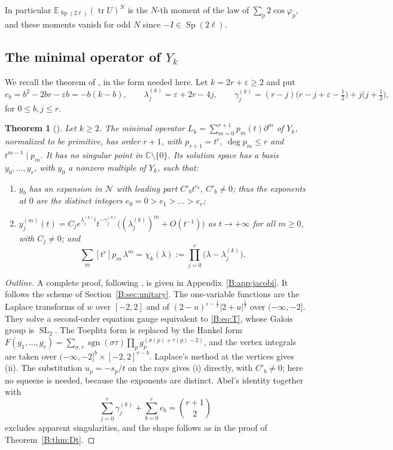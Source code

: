 \documentclass[11pt,a4paper]{article}
\newtheorem{theorem}{Theorem}[section]
\theoremstyle{definition}
\theoremstyle{remark}
\newcommand{\C}{\mathbb C}
\newcommand{\E}{\mathbb E}
\DeclareMathOperator{\sgn}{sgn}
\DeclareMathOperator{\SL}{SL}
\DeclareMathOperator{\tr}{tr}
\DeclareMathOperator{\Sp}{Sp}
\numberwithin{equation}{section}
\begin{document}
In particular $\E_{\Sp(2\ell)}(\tr U)^{N}$ is the $N$-th moment of the law of $\sum_p2\cos\varphi_p$, and these moments vanish for odd $N$ since $-I\in\Sp(2\ell)$.

\subsection{The minimal operator of \texorpdfstring{$Y_k$}{Yk}}
We recall the theorem of \cite{Kei26}, in the form needed here. Let $k=2r+\varepsilon\ge2$ and put
\begin{equation}\label{B:eq:jacobi-data}
e_b=b^2-2br-\varepsilon b=-b(k-b),\qquad \lambda^{(k)}_j=\varepsilon+2r-4j,\qquad \gamma^{(k)}_j=(r-j)\bigl(r-j+\varepsilon-\tfrac12\bigr)+j\bigl(j+\tfrac12\bigr),
\end{equation}
for $0\le b,j\le r$.

\begin{theorem}[\cite{Kei26}]\label{B:thm:jacobi}
Let $k\ge2$. The minimal operator $L_k=\sum_{m=0}^{r+1}p_m(t)\partial^m$ of $Y_k$, normalized to be primitive, has order $r+1$, with $p_{r+1}=t^r$, $\deg p_m\le r$ and $t^{m-1}\mid p_m$. It has no singular point in $\C\setminus\{0\}$. Its solution space has a basis $y_0,\dots,y_r$, with $y_0$ a nonzero multiple of $Y_k$, such that:
\begin{enumerate}
\item[(i)] $y_b$ has an expansion in $\mathcal N$ with leading part $C'_bt^{e_b}$, $C'_b\ne0$; thus the exponents at $0$ are the distinct integers $e_0=0>e_1>\dots>e_r$;
\item[(ii)] $y_j^{(m)}(t)=C_je^{\lambda^{(k)}_jt}t^{-\gamma^{(k)}_j}\bigl((\lambda^{(k)}_j)^m+O(t^{-1})\bigr)$ as $t\to+\infty$ for all $m\ge0$, with $C_j\ne0$; and
\[
\sum_m[t^r]p_m\,\lambda^m=\chi_k(\lambda):=\prod_{j=0}^{r}\bigl(\lambda-\lambda^{(k)}_j\bigr).
\]
\end{enumerate}
\end{theorem}

\begin{proof}[Outline]
A complete proof, following \cite{Kei26}, is given in Appendix~\ref{B:app:jacobi}. It follows the scheme of Section~\ref{B:sec:unitary}. The one-variable functions are the Laplace transforms of $w$ over $[-2,2]$ and of $(2-u)^{\varepsilon-\frac12}|2+u|^{\frac12}$ over $(-\infty,-2]$. They solve a second-order equation gauge equivalent to \eqref{B:eq:T}, whose Galois group is $\SL_2$. The Toeplitz form is replaced by the Hankel form $F(g_1,\dots,g_r)=\sum_{\sigma,\tau}\sgn(\sigma\tau)\prod_pg_p^{(\sigma(p)+\tau(p)-2)}$, and the vertex integrals are taken over $(-\infty,-2]^b\times[-2,2]^{r-b}$. Laplace's method at the vertices gives (ii). The substitution $u_p=-s_p/t$ on the rays gives (i) directly, with $C'_b\ne0$; here no squeeze is needed, because the exponents are distinct. Abel's identity together with
\[
\sum_{j=0}^r\gamma^{(k)}_j+\sum_{b=0}^re_b=\binom{r+1}{2}
\]
excludes apparent singularities, and the shape follows as in the proof of Theorem~\ref{B:thm:Dt}.
\end{proof}
\end{document}
